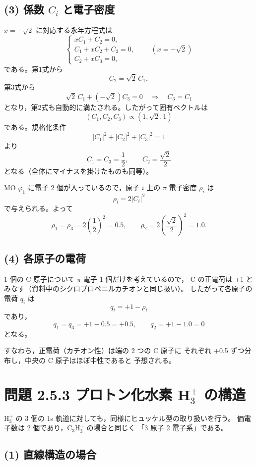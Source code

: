 \documentclass[a4paper,12pt]{jlreq}
\begin{document}
\subsection*{(3) 係数 $C_i$ と電子密度}

$x=-\sqrt{2}$ に対応する永年方程式は
\[
\begin{cases}
xC_1 + C_2      = 0,\\[2pt]
C_1 + xC_2 + C_3 = 0,\\[2pt]
C_2 + xC_3      = 0,
\end{cases}
\qquad (x=-\sqrt{2})
\]
である。第1式から
\[
C_2 = \sqrt{2}\,C_1,
\]
第3式から
\[
\sqrt{2}\,C_1 + (-\sqrt{2})C_3 = 0 \quad\Rightarrow\quad C_3 = C_1
\]
となり，第2式も自動的に満たされる。したがって固有ベクトルは
\[
(C_1,C_2,C_3) \propto (1,\sqrt{2},1)
\]
である。規格化条件
\[
|C_1|^2+|C_2|^2+|C_3|^2 = 1
\]
より
\[
C_1=C_3=\frac12,\qquad
C_2=\frac{\sqrt{2}}{2}
\]
となる（全体にマイナスを掛けたものも同等）。

MO $\varphi_1$ に電子 2 個が入っているので，原子 $i$ 上の
$\pi$ 電子密度 $\rho_i$ は
\[
\rho_i = 2|C_i|^2
\]
で与えられる。よって
\[
\rho_1 = \rho_3 = 2\left(\frac12\right)^2 = 0.5,\qquad
\rho_2 = 2\left(\frac{\sqrt{2}}2\right)^2 = 1.0.
\]

\subsection*{(4) 各原子の電荷}

1 個の C 原子について $\pi$ 電子 1 個だけを考えているので，
C の正電荷は +1 とみなす（資料中のシクロプロペニルカチオンと同じ扱い）。
したがって各原子の電荷 $q_i$ は
\[
q_i = +1 - \rho_i
\]
であり，
\[
q_1 = q_3 = +1 - 0.5 = +0.5,\qquad
q_2 = +1 - 1.0 = 0
\]
となる。

すなわち，正電荷（カチオン性）は端の 2 つの C 原子に
それぞれ +0.5 ずつ分布し，中央の C 原子はほぼ中性であると
予想される。

\section*{問題 2.5.3 プロトン化水素 H$_3^+$ の構造}

H$_3^+$ の 3 個の 1s 軌道に対しても，同様にヒュッケル型の取り扱いを行う。
価電子数は 2 個であり，C$_3$H$_3^+$ の場合と同じく
「3 原子 2 電子系」である。

\subsection*{(1) 直線構造の場合}
\end{document}
